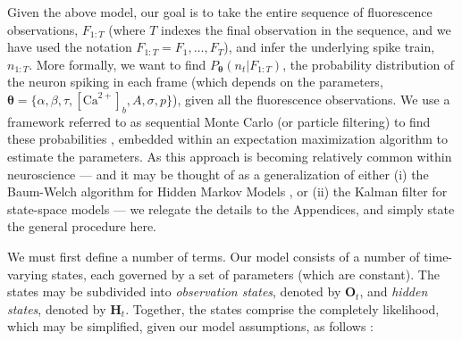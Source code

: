 \documentclass[12pt]{article}
\providecommand{\ve}[1]{\boldsymbol{#1}}
\providecommand{\ve}[1]{\boldsymbol{#1}}
\DeclareMathOperator*{\argmax}{argmax}
\newcommand{\thetn}{\ve{\theta}}
\newcommand{\p}{P_{\thetn}}
\newcommand{\Ca}{[\text{Ca}^{2+}]}
\begin{document}
Given the above model, our goal is to take the entire sequence of fluorescence observations, $F_{1:T}$ (where $T$ indexes the final observation in the sequence, and we have used the notation $F_{1:T}=F_1, \ldots, F_T$), and infer the underlying spike train, $n_{1:T}$. More formally, we want to find $\p(n_t | F_{1:T})$, the probability distribution of the neuron spiking in each frame (which depends on the parameters, $\ve{\theta}=\{\alpha, \beta, \tau, \Ca_b, A, \sigma, p\}$), given all the fluorescence observations.   
%
%
%
We use a framework referred to as sequential Monte Carlo (or particle filtering) to find these probabilities \cite{DoucetGordon01}, embedded within an expectation maximization algorithm \cite{DempsterRubin77} to estimate the parameters. As this approach is becoming relatively common within neuroscience \cite{GaoDonoghue02, BrockwellKass04, KellyLee04, SamejimaKimura04, HuysPaninski06b, Sanger07, ErgunBrown07} --- and it may be thought of as a generalization of either (i) the Baum-Welch algorithm \cite{BaumWeiss70} for Hidden Markov Models \cite{Rabiner89}, or (ii) the Kalman filter for state-space models \cite{Kalman60} ---  we relegate the details to the Appendices, and simply state the general procedure here.

We must first define a number of terms. Our model consists of a number of time-varying states, each governed by a set of parameters (which are constant). The states may be subdivided into \emph{observation states}, denoted by $\ve{O}_t$, and \emph{hidden states}, denoted by $\ve{H}_t$. Together, the states comprise the completely likelihood, which may be simplified, given our model assumptions, as follows \cite{Rabiner89}:
\end{document}

